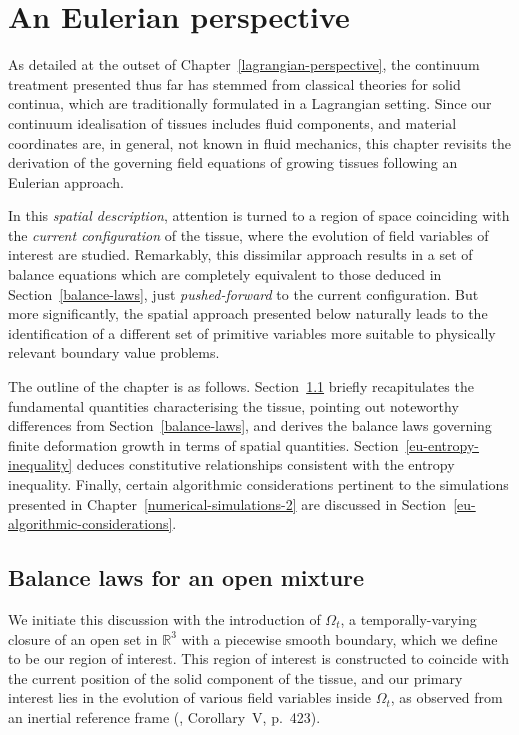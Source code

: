 \chapter{An Eulerian perspective}
\label{eulerian-perspective}

As detailed at the outset of Chapter~\ref{lagrangian-perspective}, the
continuum treatment presented thus far has stemmed from classical
theories for solid continua, which are traditionally formulated in a
Lagrangian setting. Since our continuum idealisation of tissues
includes fluid components, and material coordinates are, in general,
not known in fluid mechanics, this chapter revisits the derivation of
the governing field equations of growing tissues following an Eulerian
approach.

In this {\em spatial description}, attention is turned to a region of
space coinciding with the {\em current configuration} of the tissue,
where the evolution of field variables of interest are
studied. Remarkably, this dissimilar approach results in a set of
balance equations which are completely equivalent to those deduced in
Section~\ref{balance-laws}, just {\em pushed-forward} to the current
configuration. But more significantly, the spatial approach presented
below naturally leads to the identification of a different set of
primitive variables more suitable to physically relevant boundary
value problems.

The outline of the chapter is as
follows. Section~\ref{eu-balance-laws} briefly recapitulates the
fundamental quantities characterising the tissue, pointing out
noteworthy differences from Section~\ref{balance-laws}, and derives
the balance laws governing finite deformation growth in terms of
spatial quantities. Section~\ref{eu-entropy-inequality} deduces
constitutive relationships consistent with the entropy
inequality. Finally, certain algorithmic considerations pertinent to
the simulations presented in Chapter~\ref{numerical-simulations-2} are
discussed in Section~\ref{eu-algorithmic-considerations}.

\section{Balance laws for an open mixture}
\label{eu-balance-laws}

We initiate this discussion with the introduction of $\Omega_{t}$, a
temporally-varying closure of an open set in $\mathbb{R}^{3}$ with a
piecewise smooth boundary, which we define to be our region of
interest. This region of interest is constructed to coincide with the
current position of the solid component of the tissue, and our primary
interest lies in the evolution of various field variables inside
$\Omega_{t}$, as observed from an inertial reference frame
(\citet{newton1726}, Corollary~V, p.~423).

